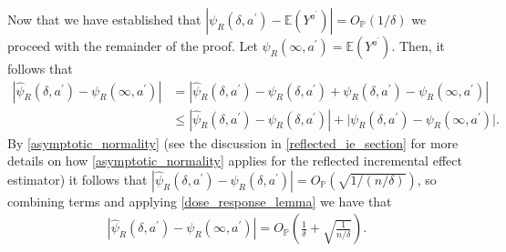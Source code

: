 \documentclass[11pt,twoside]{article}
\newcommand{\E}{\mathbb{E}}
\theoremstyle{definition}
\theoremstyle{remark}
\begin{document}
Now that we have established that $ | \psi_R(\delta, a^\prime) - \E(Y^{a^\prime})| = O_\mathbb{P}\left(1/ \delta \right)$ we proceed with the remainder of the proof. Let $\psi_R(\infty, a^\prime) = \E(Y^{a^\prime})$. Then, it follows that
\begin{align*}
    \left|\widehat{\psi}_R(\delta, a^\prime) - \psi_R(\infty, a^\prime) \right| &= \left|\widehat{\psi}_R(\delta, a^\prime) - \psi_R(\delta, a^\prime) + \psi_R(\delta, a^\prime) - \psi_R(\infty, a^\prime) \right| \\
    &\leq \left|\widehat{\psi}_R(\delta, a^\prime) - \psi_R(\delta, a^\prime) \right| + \Big|\psi_R(\delta, a^\prime) - \psi_R(\infty, a^\prime) \Big|. 
\end{align*}
By \cref{asymptotic_normality} (see the discussion in \cref{reflected_ie_section} for more details on how \cref{asymptotic_normality} applies for the reflected incremental effect estimator) it follows that $|\widehat{\psi}_R(\delta, a^\prime) - \psi_R(\delta, a^\prime)| = O_\mathbb{P}\left(\sqrt{1 / (n / \delta) } \right)$, so combining terms and applying \cref{dose_response_lemma} we have that
\begin{align*}
   \left|\widehat{\psi}_R(\delta, a^\prime) - \psi_R(\infty, a^\prime) \right| = O_\mathbb{P}\left(\frac{1}{\delta} + \sqrt{\frac{1}{n / \delta }} \right).
\end{align*}
\end{document}

